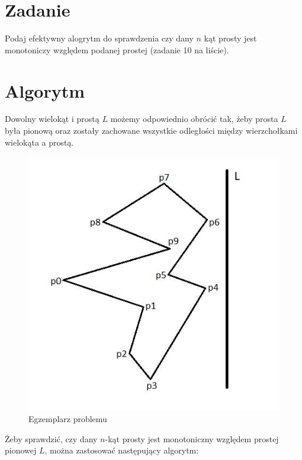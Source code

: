 \documentclass[12pt, a4paper]{article}
\begin{document}
\section*{Zadanie}

Podaj efektywny alogrytm do sprawdzenia czy dany $n$ kąt prosty jest monotoniczy względem podanej prostej (zadanie 10 na liście).
 
\section*{Algorytm}

Dowolny wielokąt i prostą $L$ możemy odpowiednio obrócić tak, żeby prosta $L$ była pionową oraz zostały zachowane wszystkie odległości między wierzchołkami wielokąta a prostą.

\begin{figure}[H]
  \begin{center}
  \includegraphics[scale=0.7]{Sample}
  \caption{Egzemplarz problemu}
  \label{fig:sample}
  \end{center}
\end{figure}

Żeby sprawdzić, czy dany $n$-kąt prosty jest monotoniczny względem prostej pionowej $L$, można zastosować następujący algorytm:
\end{document}
